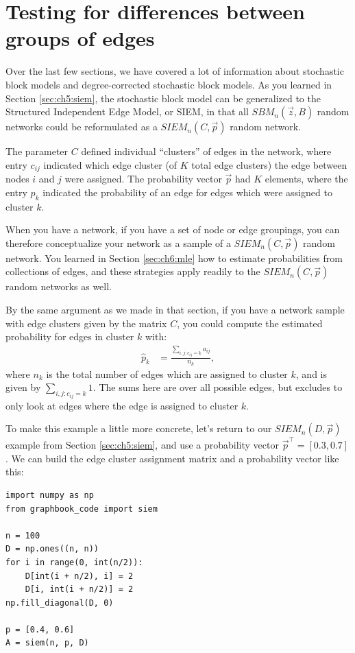 \section{Testing for differences between groups of edges}
\label{sec:ch7:testing}

Over the last few sections, we have covered a lot of information about stochastic block models and degree-corrected stochastic block models. As you learned in Section \ref{sec:ch5:siem}, the stochastic block model can be generalized to the Structured Independent Edge Model, or SIEM, in that all $SBM_n(\vec z, B)$ random networks could be reformulated as a $SIEM_n(C, \vec p)$ random network. 

The parameter $C$ defined individual ``clusters'' of edges in the network, where entry $c_{ij}$ indicated which edge cluster (of $K$ total edge clusters) the edge between nodes $i$ and $j$ were assigned. The probability vector $\vec p$ had $K$ elements, where the entry $p_k$ indicated the probability of an edge for edges which were assigned to cluster $k$.

When you have a network, if you have a set of node or edge groupings, you can therefore conceptualize your network as a sample of a $SIEM_n(C, \vec p)$ random network. You learned in Section \ref{sec:ch6:mle} how to estimate probabilities from collections of edges, and these strategies apply readily to the $SIEM_n(C, \vec p)$ random networks as well. 

By the same argument as we made in that section, if you have a network sample with edge clusters given by the matrix $C$, you could compute the estimated probability for edges in cluster $k$ with:
\begin{align*}
    \hat p_k &= \frac{\sum_{i, j : c_{ij} = k}a_{ij}}{n_k},
\end{align*}
where $n_k$ is the total number of edges which are assigned to cluster $k$, and is given by $\sum_{i, j : c_{ij} = k}1$. The sums here are over all possible edges, but excludes to only look at edges where the edge is assigned to cluster $k$.

To make this example a little more concrete, let's return to our $SIEM_n(D, \vec p)$ example from Section \ref{sec:ch5:siem}, and use a probability vector $\vec p^\top = [0.3, 0.7]$. We can build the edge cluster assignment matrix and a probability vector like this:

\begin{lstlisting}[style=python]
import numpy as np
from graphbook_code import siem

n = 100
D = np.ones((n, n))
for i in range(0, int(n/2)):
    D[int(i + n/2), i] = 2
    D[i, int(i + n/2)] = 2
np.fill_diagonal(D, 0)

p = [0.4, 0.6]
A = siem(n, p, D)
\end{lstlisting}

